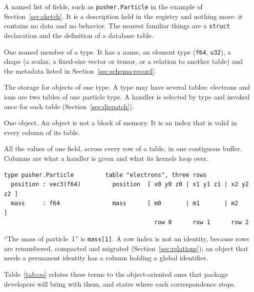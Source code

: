 \documentclass[11pt,a4paper]{article}
\newcommand{\code}[1]{\texttt{#1}}
\begin{document}
\begin{description}[style=nextline,leftmargin=2em]
  \item[Type.]
        A named list of fields, such as \code{pusher.Particle} in the
        example of Section~\ref{sec:sketch}.  It is a
        description held in the registry and nothing more: it contains no
        data and no behavior.  The nearest familiar things are a
        \code{struct} declaration and the definition of a database table.
  \item[Field.]
        One named member of a type.  It has a name, an element type
        (\code{f64}, \code{u32}), a shape (a scalar, a fixed-size vector or
        tensor, or a relation to another table) and the metadata listed in
        Section~\ref{sec:schema-record}.
  \item[Table.]
        The storage for objects of one type.  A type may have several
        tables: electrons and ions are two tables of one particle type.  A
        handler is selected by type and invoked once for each table
        (Section~\ref{sec:dispatch}).
  \item[Row.]
        One object.  An object is not a block of memory.  It is an index
        that is valid in every column of its table.
  \item[Column.]
        All the values of one field, across every row of a table, in one
        contiguous buffer.  Columns are what a handler is given and what its kernels loop over.
\end{description}

\begin{lstlisting}
type pusher.Particle         table "electrons", three rows
  position : vec3(f64)         position  [ x0 y0 z0 | x1 y1 z1 | x2 y2 z2 ]
  mass     : f64               mass      [ m0       | m1       | m2       ]
                                           row 0      row 1      row 2
\end{lstlisting}

\enquote{The mass of particle~1} is \code{mass[1]}.  A row index is not an
identity, because rows are renumbered, compacted and migrated
(Section~\ref{sec:relations}); an object that needs a permanent identity has
a column holding a global identifier.

Table~\ref{tab:oo} relates these terms to the object-oriented ones that
package developers will bring with them, and states where each
correspondence stops.
\end{document}
